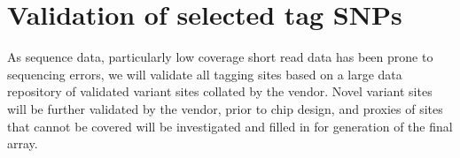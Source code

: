 \section{Validation of selected tag SNPs}

As sequence data, particularly low coverage short read data has been prone to sequencing errors, we will validate all tagging sites based on a large data repository of validated variant sites collated by the vendor. Novel variant sites will be further validated by the vendor, prior to chip design, and proxies of sites that cannot be covered will be investigated and filled in for generation of the final array.